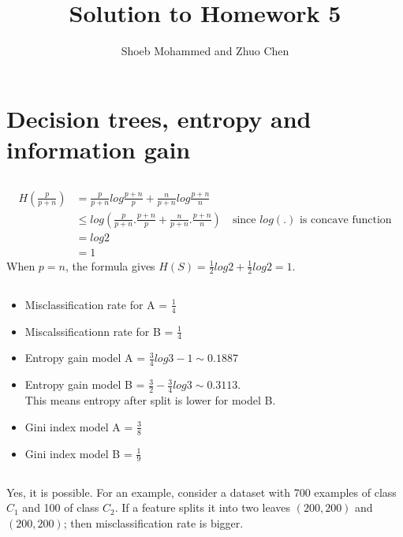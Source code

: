 \documentclass{article}
\begin{document}
\title{Solution to Homework 5}
\author{Shoeb Mohammed and Zhuo Chen}
\maketitle

\newcommand{\QEDA}{\hfill\ensuremath{\blacksquare}}
\newcommand{\QEDB}{\hfill\ensuremath{\square}}

\section{Decision trees, entropy and information gain}

\subsection{}
\begin{equation}
  \label{eq:1.1}
  \begin{split}
  H\left(\frac{p}{p+n}\right) &= \frac{p}{p+n}log\frac{p+n}{p} + \frac{n}{p+n}log\frac{p+n}{n}\\
               &\leq log\left(\frac{p}{p+n}.\frac{p+n}{p} + \frac{n}{p+n}.\frac{p+n}{n}\right) \quad \text{since $log(.)$ is concave function} \\
			   &= log2 \\
			   &= 1
  \end{split}
\end{equation}
When $p=n$, the formula gives $H(S) = \frac{1}{2}log2 + \frac{1}{2}log2 = 1$.

\subsection{}
\begin{itemize}
	\item Misclassification rate for A = $\frac{1}{4}$
	\item Miscalssificationn rate for B = $\frac{1}{4}$
	\item Entropy gain model A = $\frac{3}{4}log3 - 1 \sim 0.1887$
	\item Entropy gain model B = $\frac{3}{2} - \frac{3}{4}log3 \sim 0.3113$. \\
	      This means entropy after split is lower for model B.
	\item Gini index model A = $\frac{3}{8}$
	\item Gini index model B = $\frac{1}{9}$
\end{itemize}

\subsection{}
Yes, it is possible. For an example, consider a dataset with 700 examples of class $C_1$ and 100 of class $C_2$.
If a feature splits it into two leaves $(200,200)$ and $(200,200)$; then misclassification rate is bigger.
\end{document}
